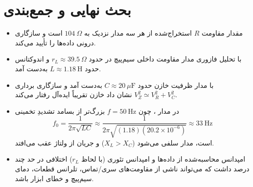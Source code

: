 \documentclass[a4paper,11pt]{article}
\begin{document}
\section{بحث نهایی و جمع‌بندی}
\begin{itemize}
\item مقدار مقاومت $R$ استخراج‌شده از هر سه مدار نزدیک به $104~\Omega$ است و سازگاری درونی داده‌ها را تأیید می‌کند.
\item با تحلیل فازوری مدار  مقاومت داخلی سیم‌پیچ در حدود $r_L\approx 39.5~\Omega$ و اندوکتانس حدود $L\approx 1.18~\mathrm{H}$ به‌دست آمد.
\item با مدار  ظرفیت خازن حدود $C\approx 20~\mu\mathrm{F}$ به‌دست آمد و سازگاری برداری $V_Z^2\simeq V_R^2+V_C^2$ نشان داد خازن تقریباً ایده‌آل رفتار می‌کند.
\item در مدار ، چون $f=50~\mathrm{Hz}$ بزرگ‌تر از بسامد تشدیدِ تخمینی
\[
f_0=\frac{1}{2\pi\sqrt{LC}}\approx \frac{1}{2\pi\sqrt{(1.18)(20.2\times 10^{-6})}}\approx 33~\mathrm{Hz}
\]
است، مدار سلفی می‌شود ($X_L>X_C$) و جریان از ولتاژ عقب می‌افتد.
\item امپدانس محاسبه‌شده از داده‌ها و امپدانس تئوری (با لحاظ $r_L$) اختلافی در حد چند درصد داشت که می‌تواند ناشی از مقاومت‌های سری/تماس، تلرانس قطعات، دمای سیم‌پیچ و خطای ابزار باشد.
\end{itemize}
\end{document}
